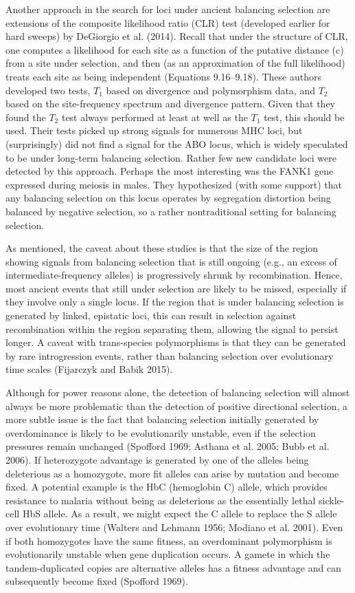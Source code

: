 \documentclass{article}
\begin{document}
Another approach in the search for loci under ancient balancing selection are extensions of the composite likelihood ratio (CLR) test (developed earlier for hard sweeps) by DeGiorgio et al. (2014). Recall that under the structure of CLR, one computes a likelihood for each site as a function of the putative distance (c) from a site under selection, and then (as an approximation of the full likelihood) treats each site as being independent (Equations 9.16–9.18). These authors developed two tests,  $ T_{1} $ based on divergence and polymorphism data, and  $ T_{2} $ based on the site-frequency spectrum and divergence pattern. Given that they found the  $ T_{2} $ test always performed at least at well as the  $ T_{1} $ test, this should be used. Their tests picked up strong signals for numerous MHC loci, but (surprisingly) did not find a signal for the ABO locus, which is widely speculated to be under long-term balancing selection. Rather few new candidate loci were detected by this approach. Perhaps the most interesting was the FANK1 gene expressed during meiosis in males. They hypothesized (with some support) that any balancing selection on this locus operates by segregation distortion being balanced by negative selection, so a rather nontraditional setting for balancing selection.

As mentioned, the caveat about these studies is that the size of the region showing signals from balancing selection that is still ongoing (e.g., an excess of intermediate-frequency alleles) is progressively shrunk by recombination. Hence, most ancient events that still under selection are likely to be missed, especially if they involve only a single locus. If the region that is under balancing selection is generated by linked, epistatic loci, this can result in selection against recombination within the region separating them, allowing the signal to persist longer. A caveat with trans-species polymorphisms is that they can be generated by rare introgression events, rather than balancing selection over evolutionary time scales (Fijarczyk and Babik 2015).

Although for power reasons alone, the detection of balancing selection will almost always be more problematic than the detection of positive directional selection, a more subtle issue is the fact that balancing selection initially generated by overdominance is likely to be evolutionarily unstable, even if the selection pressures remain unchanged (Spofford 1969; Asthana et al. 2005; Bubb et al. 2006). If heterozygote advantage is generated by one of the alleles being deleterious as a homozygote, more fit alleles can arise by mutation and become fixed. A potential example is the HbC (hemoglobin C) allele, which provides resistance to malaria without being as deleterious as the essentially lethal sickle-cell HbS allele. As a result, we might expect the C allele to replace the S allele over evolutionary time (Walters and Lehmann 1956; Modiano et al. 2001). Even if both homozygotes have the same fitness, an overdominant polymorphism is evolutionarily unstable when gene duplication occurs. A gamete in which the tandem-duplicated copies are alternative alleles has a fitness advantage and can subsequently become fixed (Spofford 1969).
\end{document}
